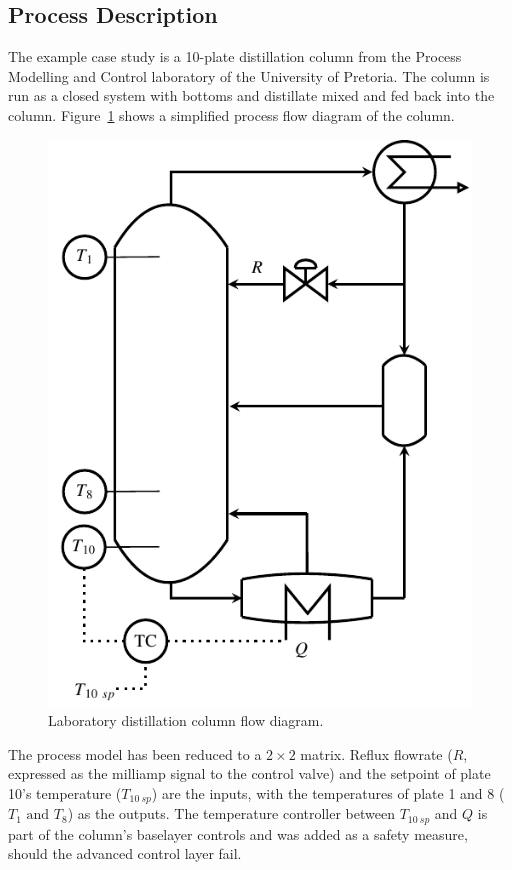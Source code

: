 \documentclass[final,authoryear,5pt,times,twocolumn]{elsarticle}
\begin{document}
\subsection{Process Description}
The example case study is a 10-plate distillation column from the Process Modelling and Control laboratory of the University of Pretoria.
The column is run as a closed system with bottoms and distillate mixed and fed back into the column.
Figure~\ref{fig:columnpfd} shows a simplified process flow diagram of the column.
\begin{figure}[htbp]
  \centering
    \includegraphics{figure1.pdf}
  \caption[Laboratory distillation column photo and flow diagram]{Laboratory distillation column flow diagram.}
  \label{fig:columnpfd}
\end{figure}

The process model has been reduced to a $2\times2$ matrix.
Reflux flowrate ($R$, expressed as the milliamp signal to the control valve) and the setpoint of plate 10's temperature ($T_{10~sp}$) are the inputs, with the temperatures of plate 1 and 8 ($T_1\text{ and }T_{8}$) as the outputs.
The temperature controller between $T_{10~sp}$ and $Q$ is part of the column's baselayer controls and was added as a safety measure, should the advanced control layer fail.
\end{document}
